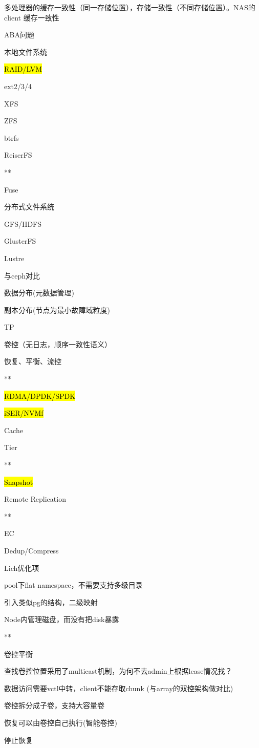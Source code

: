 多处理器的缓存一致性（同一存储位置），存储一致性（不同存储位置）。NAS的client 缓存一致性

ABA问题

本地文件系统
\begin{enumbox}
\item \hl{RAID/LVM}
\item ext2/3/4
\item XFS
\item ZFS
\item btrfs
\item ReiserFS
\item ***
\item Fuse
\end{enumbox}

分布式文件系统
\begin{enumbox}
\item GFS/HDFS
\item GlusterFS
\item Lustre
\end{enumbox}

与ceph对比
\begin{enumbox}
\item 数据分布(元数据管理)
\item 副本分布(节点为最小故障域粒度)
\item TP
\item 卷控（无日志，顺序一致性语义）
\item 恢复、平衡、流控
\item ***
\item \hl{RDMA/DPDK/SPDK}
\item \hl{iSER/NVMf}
\item Cache
\item Tier
\item ***
\item \hl{Snapshot}
\item Remote Replication
\item ***
\item EC
\item Dedup/Compress
\end{enumbox}

Lich优化项
\begin{enumbox}
\item pool下flat namespace，不需要支持多级目录
\item 引入类似pg的结构，二级映射
\item Node内管理磁盘，而没有把disk暴露
\item ***
\item 卷控平衡
\item 查找卷控位置采用了multicast机制，为何不去admin上根据lease情况找？
\item 数据访问需要vctl中转，client不能存取chunk (与array的双控架构做对比)
\item 卷控拆分成子卷，支持大容量卷
\item 恢复可以由卷控自己执行(智能卷控)
\item 停止恢复
\end{enumbox}

